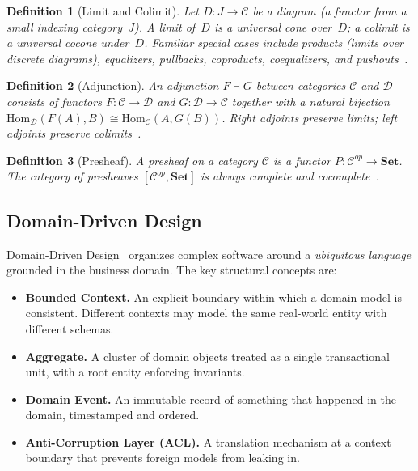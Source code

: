 \documentclass[11pt,a4paper]{article}
\newtheorem{definition}{Definition}[section]
\begin{document}
\begin{definition}[Limit and Colimit]
Let $D:J\to\mathcal{C}$ be a diagram (a functor from a small indexing
category~$J$). A \emph{limit} of~$D$ is a universal cone over~$D$;
a \emph{colimit} is a universal cocone under~$D$. Familiar special
cases include products (limits over discrete diagrams), equalizers,
pullbacks, coproducts, coequalizers, and pushouts~\citep{maclane1998}.
\end{definition}

\begin{definition}[Adjunction]
An \emph{adjunction} $F\dashv G$ between categories $\mathcal{C}$ and
$\mathcal{D}$ consists of functors $F:\mathcal{C}\to\mathcal{D}$ and
$G:\mathcal{D}\to\mathcal{C}$ together with a natural bijection
$\mathrm{Hom}_{\mathcal{D}}(F(A),B)\cong\mathrm{Hom}_{\mathcal{C}}(A,G(B))$.
Right adjoints preserve limits; left adjoints preserve
colimits~\citep{maclane1998}.
\end{definition}

\begin{definition}[Presheaf]
A \emph{presheaf} on a category $\mathcal{C}$ is a functor
$P:\mathcal{C}^{op}\to\mathbf{Set}$. The category of presheaves
$[\mathcal{C}^{op},\mathbf{Set}]$ is always complete and
cocomplete~\citep{maclane1998}.
\end{definition}

\subsection{Domain-Driven Design}
\label{sec:ddd-background}

Domain-Driven Design~\citep{evans2004,vernon2013} organizes complex
software around a \emph{ubiquitous language} grounded in the business
domain. The key structural concepts are:

\begin{itemize}
  \item \textbf{Bounded Context.} An explicit boundary within which a
    domain model is consistent. Different contexts may model the same
    real-world entity with different schemas.
  \item \textbf{Aggregate.} A cluster of domain objects treated as a
    single transactional unit, with a root entity enforcing invariants.
  \item \textbf{Domain Event.} An immutable record of something that
    happened in the domain, timestamped and ordered.
  \item \textbf{Anti-Corruption Layer (ACL).} A translation mechanism
    at a context boundary that prevents foreign models from leaking in.
\end{itemize}
\end{document}
